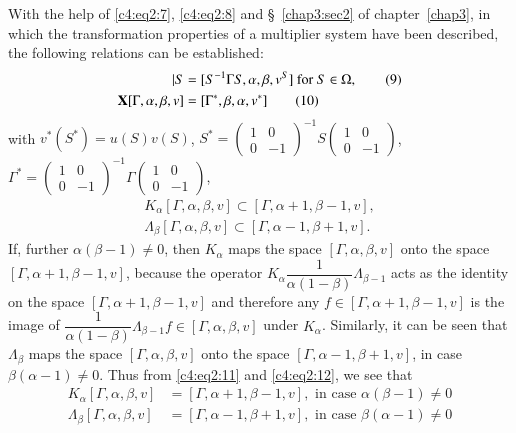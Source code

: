 With the help of \eqref{c4:eq2:7}, \eqref{c4:eq2:8} and \S~\ref{chap3:sec2} 
of chapter~\ref{chap3}, in which the
transformation properties of a multiplier system have been described,
the following relations can be established:
\begin{align*}
[\Gamma, \alpha, \beta, v] |S & = [S^{-1}\Gamma S, \alpha, \beta, v^S]
\text{ for } S \in \Omega, \tag{9}\label{c4:eq2:9}\\
\bX [\Gamma, \alpha, \beta, v] & = [\Gamma^{\ast}, \beta, \alpha,
  v^{\ast}] \tag{10}\label{c4:eq2:10}
\end{align*}
with $v^{\ast}(S^{\ast}) = u(S)v(S)$, $S^{\ast} =
\left(\begin{smallmatrix} 1&0\\0&-1\end{smallmatrix}\right)^{-1} S
  \left(\begin{smallmatrix} 1&0\\0&-1 \end{smallmatrix}\right)$,
  $\Gamma^{\ast} = \left(\begin{smallmatrix}
    1&0\\0&-1\end{smallmatrix}\right)^{-1}\Gamma
    \left(\begin{smallmatrix} 1&0\\0&-1\end{smallmatrix}\right)$, 
\begin{gather*}
K_{\alpha} [\Gamma, \alpha,\beta,v] \subset [\Gamma, \alpha+1,
  \beta-1, v], \tag{11}\label{c4:eq2:11}\\
\Lambda_{\beta}[\Gamma,\alpha,\beta,v] \subset [\Gamma, \alpha-1,
  \beta+1, v]. \tag{12}\label{c4:eq2:12}
\end{gather*}
If, further $\alpha(\beta-1)\neq 0$, then $K_{\alpha}$ maps the space
$[\Gamma, \alpha, \beta,v]$ onto the space $[\Gamma, \alpha+1,
  \beta-1,v]$, because the operator
$K_{\alpha}\dfrac{1}{\alpha(1-\beta)} \Lambda_{\beta-1}$ acts as the
identity on the space $[\Gamma, \alpha+1, \beta-1, v]$ and therefore
any $f\in[\Gamma,\alpha+1, \beta-1,v]$ is the image of
$\dfrac{1}{\alpha(1-\beta)}\Lambda_{\beta-1} f\in [\Gamma,
  \alpha,\beta,v]$ under $K_{\alpha}$. Similarly, it can be seen that
$\Lambda_{\beta}$ maps the space $[\Gamma, \alpha, \beta, v]$ onto the
space $[\Gamma, \alpha-1, \beta+1, v]$, in case $\beta(\alpha-1)\neq
0$. Thus from \eqref{c4:eq2:11} and \eqref{c4:eq2:12}, we see that
\begin{align*}
K_{\alpha}[\Gamma, \alpha, \beta, v] & = [\Gamma, \alpha+1, \beta-1,
  v], \text{ in case } \alpha(\beta-1) \neq 0 \tag{11'}\label{c4:eq2:11'}\\
\Lambda_{\beta} [\Gamma, \alpha, \beta, v] & = [\Gamma, \alpha-1,
  \beta+1,v], \text{ in case } \beta (\alpha-1) \neq 0 \tag{12'}\label{c4:eq2:12'}
\end{align*}
